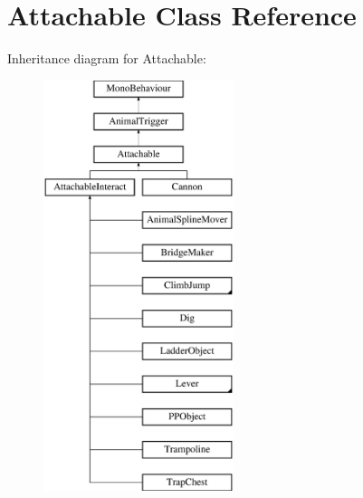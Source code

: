 \hypertarget{class_attachable}{}\section{Attachable Class Reference}
\label{class_attachable}
Inheritance diagram for Attachable\+:\begin{figure}[H]
\begin{center}
\leavevmode
\includegraphics[height=12.000000cm]{class_attachable}
\end{center}
\end{figure}
